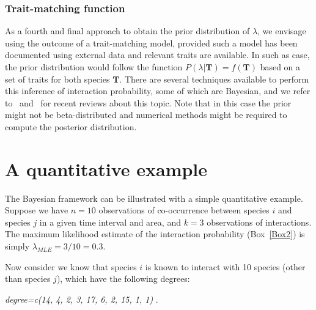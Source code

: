 \documentclass[12pt]{article}
\begin{document}
      \subsubsection*{Trait-matching function} 


          As a fourth and final approach to obtain the prior distribution of $\lambda$, we envisage using the outcome of a trait-matching model, provided such a model has been documented using external data and relevant traits are available. 
          In such as case, the prior distribution would follow the function $P(\lambda|\mathbf{T})=f(\mathbf{T})$ based on a set of traits for both species $\mathbf{T}$. There are several techniques available to perform this inference of interaction probability, some of which are Bayesian, and we refer to~\citet{Bartomeus2016} and~\citet{Weinstein2017} for recent reviews about this topic. Note that in this case the prior might not be beta-distributed and numerical methods might be required to compute the posterior distribution.  


\section*{A quantitative example}

  The Bayesian framework can be illustrated with a simple quantitative example. Suppose we have $n = 10$ observations of co-occurrence between species $i$ and species $j$ in a given time interval and area, and $k = 3$ observations of interactions. The maximum likelihood estimate of the interaction probability (Box~\ref{Box2}) is simply $\lambda_{MLE} = 3/10 = 0.3$. 
  

  Now consider we know that species $i$ is known to interact with 10 species (other than species $j$), which have the following degrees:

    \vspace{12pt}
    \noindent\emph{
      degree=c(14, 4, 2, 3, 17, 6, 2, 15, 1, 1)
        }.
      \vspace{12pt}
\end{document}
